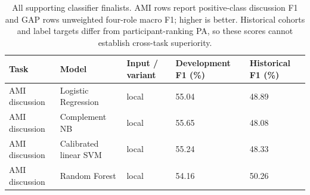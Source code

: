 \documentclass[journal]{IEEEtran}
\begin{document}
\begin{table}[t]
\caption{All supporting classifier finalists. AMI rows report positive-class discussion F1 and GAP rows unweighted four-role macro F1; higher is better. Historical cohorts and label targets differ from participant-ranking PA, so these scores cannot establish cross-task superiority.}
\label{tab:9}
\centering\footnotesize
\setlength{\tabcolsep}{3pt}
\renewcommand{\arraystretch}{1.13}
\begin{tabular}{p{}p{}p{}p{}p{}}
\toprule
{\raggedright Task\par} & {\raggedright Model\par} & {\raggedright Input / variant\par} & {\raggedright Development F1 (\%)\par} & {\raggedright Historical F1 (\%)\par} \\
\midrule
{\raggedright AMI discussion\par} & {\raggedright Logistic Regression\par} & {\raggedright local\par} & {\raggedright 55.04\par} & {\raggedright 48.89\par} \\
{\raggedright AMI discussion\par} & {\raggedright Complement NB\par} & {\raggedright local\par} & {\raggedright 55.65\par} & {\raggedright 48.08\par} \\
{\raggedright AMI discussion\par} & {\raggedright Calibrated linear SVM\par} & {\raggedright local\par} & {\raggedright 55.24\par} & {\raggedright 48.33\par} \\
{\raggedright AMI discussion\par} & {\raggedright Random Forest\par} & {\raggedright local\par} & {\raggedright 54.16\par} & {\raggedright 50.26\par} \\

\end{tabular}
\end{table}
\end{document}
